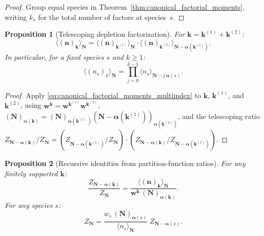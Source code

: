\documentclass[11pt]{amsart}
\newcommand{\GFensemble}{Z}
\theoremstyle{definition}
\theoremstyle{plain}
\newtheorem{proposition}{Proposition}
\theoremstyle{remark}
\begin{document}
\begin{proof}
Group equal species in Theorem~\ref{thm:canonical_factorial_moments}, writing $k_s$ for the total number of factors at species~$s$.
\end{proof}

\begin{proposition}[Telescoping depletion factorization]
\label{prop:canonical_factorial_moment_telescoping}
For $\mathbf{k}=\mathbf{k}^{(1)}+\mathbf{k}^{(2)}$:
\begin{equation}\label{eq:canonical_factorial_telescoping}
\langle(\mathbf{n})_{\mathbf{k}}\rangle_{\mathbf{N}}
=
\langle(\mathbf{n})_{\mathbf{k}^{(1)}}\rangle_{\mathbf{N}}
\cdot
\langle(\mathbf{n})_{\mathbf{k}^{(2)}}\rangle_{\mathbf{N}-\boldsymbol{\alpha}(\mathbf{k}^{(1)})}.
\end{equation}
In particular, for a fixed species $s$ and $k\ge 1$:
\begin{equation}\label{eq:canonical_factorial_single_species_product}
\langle (n_s)_k\rangle_{\mathbf{N}}
=
\prod_{j=0}^{k-1}\langle n_s\rangle_{\mathbf{N}-j\,\boldsymbol{\alpha}(s)}.
\end{equation}
\end{proposition}

\begin{proof}
Apply \eqref{eq:canonical_factorial_moments_multiindex} to $\mathbf{k}$, $\mathbf{k}^{(1)}$, and $\mathbf{k}^{(2)}$, using
$\mathbf{w}^{\mathbf{k}}
=
\mathbf{w}^{\mathbf{k}^{(1)}}
\mathbf{w}^{\mathbf{k}^{(2)}}$,
$(\mathbf{N})_{\boldsymbol{\alpha}(\mathbf{k})}
=
(\mathbf{N})_{\boldsymbol{\alpha}(\mathbf{k}^{(1)})}
(\mathbf{N}-\boldsymbol{\alpha}(\mathbf{k}^{(1)}))_{\boldsymbol{\alpha}(\mathbf{k}^{(2)})}$,
and the telescoping ratio
$\GFensemble_{\mathbf{N}-\boldsymbol{\alpha}(\mathbf{k})}/\GFensemble_{\mathbf{N}}
=
(\GFensemble_{\mathbf{N}-\boldsymbol{\alpha}(\mathbf{k}^{(1)})}/\GFensemble_{\mathbf{N}})
\cdot
(\GFensemble_{\mathbf{N}-\boldsymbol{\alpha}(\mathbf{k})}/\GFensemble_{\mathbf{N}-\boldsymbol{\alpha}(\mathbf{k}^{(1)})})$.
\end{proof}

\begin{proposition}[Recursive identities from partition-function ratios]
\label{prop:canonical_factorial_moment_recursions}
For any finitely supported $\mathbf{k}$:
\begin{equation}\label{eq:canonical_ratio_from_moment}
\frac{\GFensemble_{\mathbf{N}-\boldsymbol{\alpha}(\mathbf{k})}}{\GFensemble_{\mathbf{N}}}
=
\frac{\langle (\mathbf{n})_{\mathbf{k}}\rangle_{\mathbf{N}}}
{\mathbf{w}^{\mathbf{k}}\,(\mathbf{N})_{\boldsymbol{\alpha}(\mathbf{k})}}.
\end{equation}
For any species $s$:
\begin{equation}\label{eq:canonical_partition_recursion_from_mean}
\GFensemble_{\mathbf{N}}
=
\frac{w_s\,(\mathbf{N})_{\boldsymbol{\alpha}(s)}}{\langle n_s\rangle_{\mathbf{N}}}\;
\GFensemble_{\mathbf{N}-\boldsymbol{\alpha}(s)}.
\end{equation}
\end{proposition}
\end{document}
